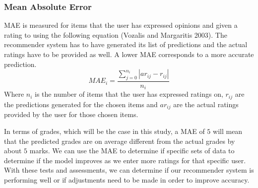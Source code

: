 \subsubsection{Mean Absolute Error}
MAE is measured for items that the user has expressed opinions and given a rating to using the following equation (Vozalis and Margaritis 2003). The recommender system has to have generated its list of predictions and the actual ratings have to be provided as well. A lower MAE corresponds to a more accurate prediction.
\begin{equation} \label{eq:1}
MAE_i= \frac{\sum\limits_{j=0}^{n_i} {\left|ar_{ij} - r_{ij} \right|} } {n_i}
\end{equation}
Where $n_i$ is the number of items that the user has expressed ratings on, $r_{ij}$ are the predictions generated for the chosen items and $ar_{ij}$ are the actual ratings provided by the user for those chosen items.

In terms of grades, which will be the case in this study, a MAE of $5$ will mean that the predicted grades are on average different from the actual grades by about $5$ marks.
We can use the MAE to determine if specific sets of data to determine if the model improves as we enter more ratings for that specific user. With these tests and assessments, we can determine if our recommender system is performing well or if adjustments need to be made in order to improve accuracy.
